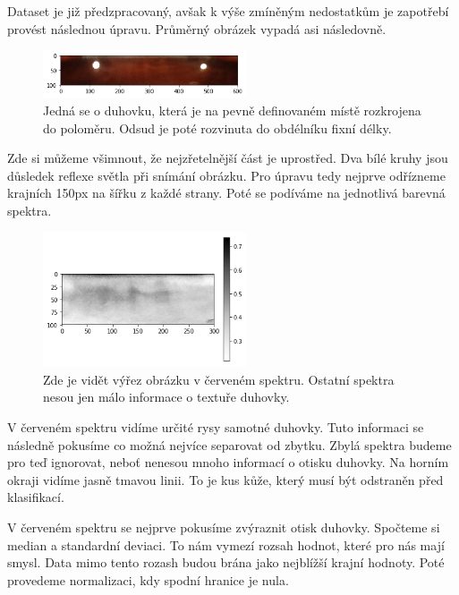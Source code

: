 \documentclass[a4paper,10pt,twocolumn]{article}
\begin{document}
Dataset je již předzpracovaný, avšak k výše zmíněným nedostatkům je zapotřebí provést následnou úpravu. Průměrný obrázek vypadá asi následovně.
\begin{figure}[H]
       \begin{center}
              \includegraphics[width=6cm]{image_raw.png}
       \end{center}
       \caption{Jedná se o duhovku, která je na pevně definovaném místě rozkrojena do poloměru. Odsud je poté rozvinuta do obdélníku fixní délky.}
       \label{fig1}
\end{figure}

Zde si můžeme všimnout, že nejzřetelnější část je uprostřed. Dva bílé kruhy jsou důsledek reflexe světla při snímání obrázku. Pro úpravu tedy nejprve odřízneme krajních 150px na šířku z každé strany. Poté se podíváme na jednotlivá barevná spektra.

\begin{figure}[H]
      \begin{center}
            \includegraphics[width=6cm]{image_crop_red.png}
            \vspace{1mm}  
      \end{center}
      \caption{Zde je vidět výřez obrázku v červeném spektru. Ostatní spektra nesou jen málo informace o  textuře duhovky.}
\label{fig2}
\end{figure}

V červeném spektru vidíme určité rysy samotné duhovky. Tuto informaci se následně pokusíme co možná nejvíce separovat od zbytku. Zbylá spektra budeme pro teď ignorovat, neboť nenesou mnoho informací o otisku duhovky. Na horním okraji vidíme jasně tmavou linii. To je kus kůže, který musí být odstraněn před klasifikací. \par
V červeném spektru se nejprve pokusíme zvýraznit otisk duhovky. Spočteme si median a standardní deviaci. To nám vymezí rozsah hodnot, které pro nás mají smysl. Data mimo tento rozash budou brána jako nejblížší krajní hodnoty. Poté provedeme normalizaci, kdy spodní hranice je nula.
\end{document}
